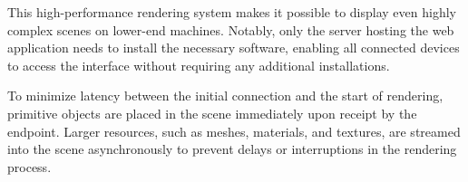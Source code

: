 This high-performance rendering system makes it possible to display even highly complex scenes on lower-end machines. Notably, only the server hosting the web application needs to install the necessary software, enabling all connected devices to access the interface without requiring any additional installations.

To minimize latency between the initial connection and the start of rendering, primitive objects are placed in the scene immediately upon receipt by the endpoint. Larger resources, such as meshes, materials, and textures, are streamed into the scene asynchronously to prevent delays or interruptions in the rendering process.

 